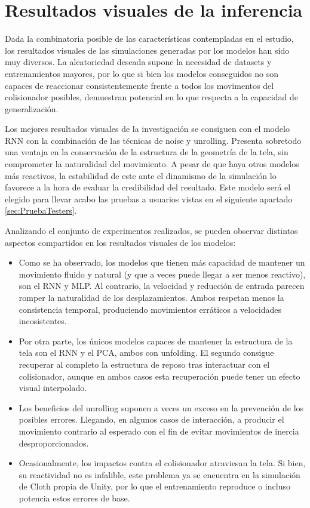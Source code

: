 \section{Resultados visuales de la inferencia}
\label{sec:Visual}

Dada la combinatoria posible de las características contempladas en el estudio, los resultados visuales de las simulaciones generadas por los modelos han sido muy diversos. La aleatoriedad deseada supone la necesidad de datasets y entrenamientos mayores, por lo que si bien los modelos conseguidos no son capaces de reaccionar consistentemente frente a todos los movimentos del colisionador posibles, demuestran potencial en lo que respecta a la capacidad de generalización. \newline

Los mejores resultados visuales de la investigación se consiguen con el modelo RNN con la combinación de las técnicas de noise y unrolling. Presenta sobretodo una ventaja en la conservación de la estructura de la geometría de la tela, sin comprometer la naturalidad del movimiento. A pesar de que haya otros modelos más reactivos, la estabilidad de este ante el dinamismo de la simulación lo favorece a la hora de evaluar la credibilidad del resultado. Este modelo será el elegido para llevar acabo las pruebas a usuarios vistas en el siguiente apartado \ref{sec:PruebaTesters}. \newline

Analizando el conjunto de experimentos realizados, se pueden observar distintos aspectos compartidos en los resultados visuales de los modelos:

\begin{itemize}
  \item Como se ha observado, los modelos que tienen más capacidad de mantener un movimiento fluido y natural (y que a veces puede llegar a ser menos reactivo), son el RNN y MLP. Al contrario, la velocidad y reducción de entrada parecen romper la naturalidad de los desplazamientos. Ambos respetan menos la consistencia temporal, produciendo movimientos erráticos a velocidades incosistentes.
  \item Por otra parte, los únicos modelos capaces de mantener la estructura de la tela son el RNN y el PCA, ambos con unfolding. El segundo consigue recuperar al completo la estructura de reposo tras interactuar con el colisionador, aunque en ambos casos esta recuperación puede tener un efecto visual interpolado. 
  \item Los beneficios del unrolling suponen a veces un exceso en la prevención de los posibles errores. Llegando, en algunos casos de interacción, a producir el movimiento contrario al esperado con el fin de evitar movimientos de inercia desproporcionados.
  \item Ocasionalmente, los impactos contra el colisionador atraviesan la tela. Si bien, su reactividad no es infalible, este problema ya se encuentra en la simulación de Cloth propia de Unity, por lo que el entrenamiento reproduce o incluso potencia estos errores de base.
\end{itemize}